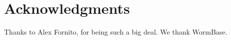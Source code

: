 \documentclass[10pt,letterpaper]{article}
\begin{document}
\section*{Acknowledgments}
Thanks to Alex Fornito, for being such a big deal.
We thank WormBase.

\nolinenumbers

%
%
%



%
%

\end{document}
